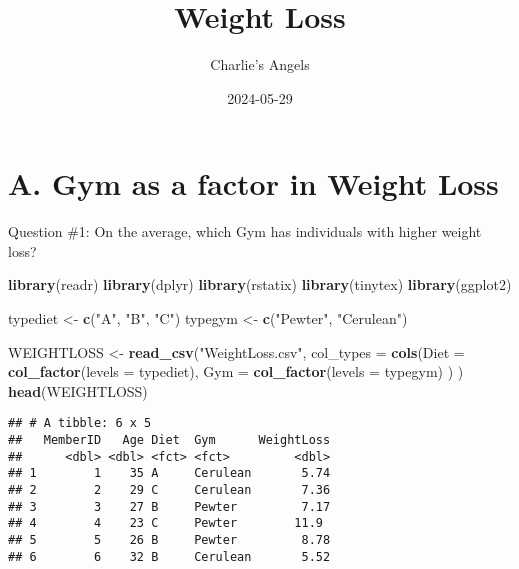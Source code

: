 \documentclass[
]{article}
\title{Weight Loss}
\author{Charlie's Angels}
\date{2024-05-29}
\newenvironment{Shaded}{\begin{snugshade}}{\end{snugshade}}
\newcommand{\AttributeTok}[1]{\textcolor[rgb]{0.13,0.29,0.53}{#1}}
\newcommand{\ConstantTok}[1]{\textcolor[rgb]{0.56,0.35,0.01}{#1}}
\newcommand{\FunctionTok}[1]{\textcolor[rgb]{0.13,0.29,0.53}{\textbf{#1}}}
\newcommand{\NormalTok}[1]{#1}
\newcommand{\OtherTok}[1]{\textcolor[rgb]{0.56,0.35,0.01}{#1}}
\newcommand{\SpecialCharTok}[1]{\textcolor[rgb]{0.81,0.36,0.00}{\textbf{#1}}}
\newcommand{\StringTok}[1]{\textcolor[rgb]{0.31,0.60,0.02}{#1}}
\begin{document}
\maketitle

\begin{Shaded}
\end{Shaded}

\section{A. Gym as a factor in Weight
Loss}\label{a.-gym-as-a-factor-in-weight-loss}

Question \#1: On the average, which Gym has individuals with higher
weight loss?

\begin{Shaded}
\begin{Highlighting}[]
\FunctionTok{library}\NormalTok{(readr)}
\FunctionTok{library}\NormalTok{(dplyr)}
\FunctionTok{library}\NormalTok{(rstatix)}
\FunctionTok{library}\NormalTok{(tinytex)}
\FunctionTok{library}\NormalTok{(ggplot2)}

\NormalTok{typediet }\OtherTok{\textless{}{-}} \FunctionTok{c}\NormalTok{(}\StringTok{"A"}\NormalTok{, }\StringTok{"B"}\NormalTok{, }\StringTok{"C"}\NormalTok{)}
\NormalTok{typegym }\OtherTok{\textless{}{-}} \FunctionTok{c}\NormalTok{(}\StringTok{"Pewter"}\NormalTok{, }\StringTok{"Cerulean"}\NormalTok{)}


\NormalTok{WEIGHTLOSS }\OtherTok{\textless{}{-}} \FunctionTok{read\_csv}\NormalTok{(}\StringTok{"WeightLoss.csv"}\NormalTok{, }
                       \AttributeTok{col\_types =} \FunctionTok{cols}\NormalTok{(}\AttributeTok{Diet =} \FunctionTok{col\_factor}\NormalTok{(}\AttributeTok{levels =}\NormalTok{ typediet), }
                                        \AttributeTok{Gym =} \FunctionTok{col\_factor}\NormalTok{(}\AttributeTok{levels =}\NormalTok{ typegym)}
\NormalTok{                                       )}
\NormalTok{                      )}
\FunctionTok{head}\NormalTok{(WEIGHTLOSS)}
\end{Highlighting}
\end{Shaded}

\begin{verbatim}
## # A tibble: 6 x 5
##   MemberID   Age Diet  Gym      WeightLoss
##      <dbl> <dbl> <fct> <fct>         <dbl>
## 1        1    35 A     Cerulean       5.74
## 2        2    29 C     Cerulean       7.36
## 3        3    27 B     Pewter         7.17
## 4        4    23 C     Pewter        11.9 
## 5        5    26 B     Pewter         8.78
## 6        6    32 B     Cerulean       5.52
\end{verbatim}
\end{document}
